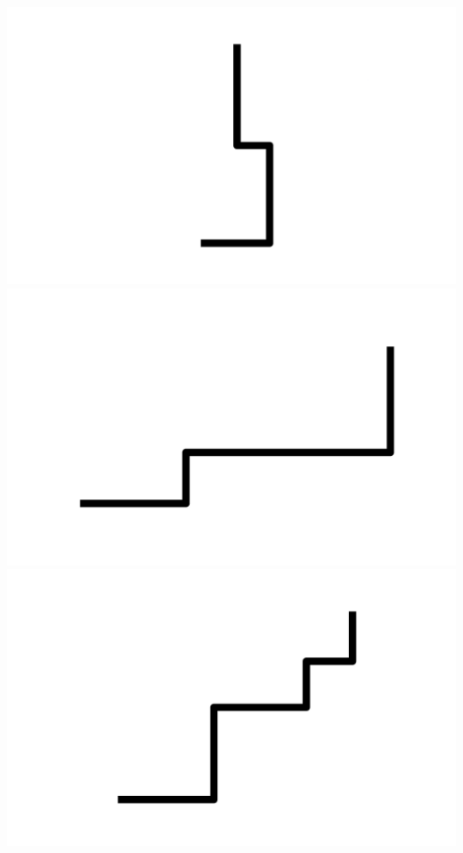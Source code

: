 \documentclass[]{report}
\begin{document}
\includegraphics[scale=.1]{pictures/21/state_cluster_shapes_43.pdf} 
\includegraphics[scale=.1]{pictures/21/state_cluster_shapes_44.pdf} 
\includegraphics[scale=.1]{pictures/21/state_cluster_shapes_45.pdf} 
\end{document}
